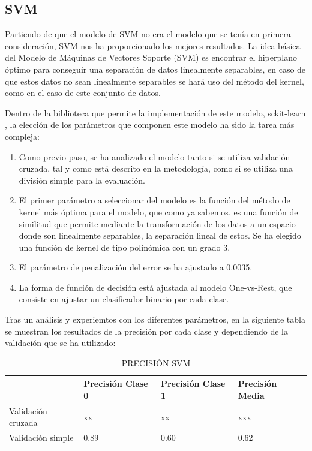 \documentclass[journal,twoside]{JoPhA}
\begin{document}
\subsection{SVM}
	
Partiendo de que el modelo de SVM no era el modelo que se tenía en primera consideración, SVM nos ha proporcionado los mejores resultados. La idea básica del Modelo de Máquinas de Vectores Soporte (SVM) es encontrar el hiperplano óptimo para conseguir una separación de datos linealmente separables, en caso de que estos datos no sean linealmente separables se hará uso del método del kernel, como en el caso de este conjunto de datos.

Dentro de la biblioteca que permite la implementación de este modelo, sckit-learn \cite{svm}, la elección de los parámetros que componen este modelo ha sido la tarea más compleja:

\begin{enumerate}
\item Como previo paso, se ha analizado el modelo tanto si se utiliza validación cruzada, tal y como está descrito en la metodología, como si se utiliza una división simple para la evaluación.
\item El primer parámetro a seleccionar del modelo es la función del método de kernel más óptima para el modelo, que como ya sabemos, es una función de similitud que permite mediante la transformación de los datos a un espacio donde son linealmente separables, la separación lineal de estos. Se ha elegido una función de kernel de tipo polinómica con un grado 3.
\item El parámetro de penalización del error se ha ajustado a 0.0035.
\item La forma de función de decisión está ajustada al modelo One-vs-Rest, que consiste en ajustar un clasificador binario por cada clase.
\end{enumerate} 

Tras un análisis y experiemtos con los diferentes parámetros, en la siguiente tabla se muestran los resultados de la precisión por cada clase y dependiendo de la validación que se ha utilizado:

\begin{table}[htb!]
\begin{center}
	\begin{tabular}{| p{2cm} | p{2cm} | p{2cm} | p{2cm} |}
		\hline
		 & Precisión Clase 0 & Precisión Clase 1 & Precisión Media \\
		 \hline
		 Validación cruzada & xx & xx & xxx \\
		 \hline
		 Validación simple & 0.89 & 0.60 & 0.62 \\
		 \hline
	\end{tabular}
	\caption{PRECISIÓN SVM}
	\label{tabla:tabla_mlp}
\end{center}
\end{table}
\end{document}
